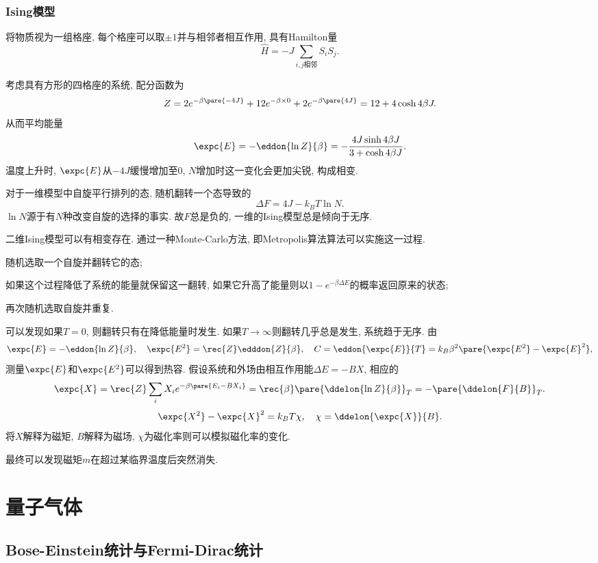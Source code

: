 \documentclass[../Thermal.tex]{subfiles}
\begin{document}
\subsubsection{Ising模型}
将物质视为一组格座, 每个格座可以取$\pm 1$并与相邻者相互作用, 具有Hamilton量
\[ \hat{H} = -J\sum_{i,j{\textit{相邻}}} S_i S_j. \]
\begin{ex}
考虑具有方形的四格座的系统, 配分函数为
\[ Z = 2e^{-\beta\pare{-4J}} + 12e^{-\beta\times 0} + 2e^{-\beta\pare{4J}} = 12+4\cosh 4\beta J. \]
从而平均能量
\[ \expc{E} = -\eddon{\ln Z}{\beta} = -\frac{4J\sinh 4\beta J}{3+\cosh 4\beta J}. \]
温度上升时, $\expc{E}$从$-4J$缓慢增加至$0$, $N$增加时这一变化会更加尖锐, 构成相变.
\end{ex}
对于一维模型中自旋平行排列的态, 随机翻转一个态导致的
\[ \Delta F = 4J - k_B T\ln N. \]
$\ln N$源于有$N$种改变自旋的选择的事实. 故$F$总是负的, 一维的Ising模型总是倾向于无序.
\par
二维Ising模型可以有相变存在. 通过一种Monte-Carlo方法, 即Metropolis算法算法可以实施这一过程.
\begin{cenum}
\item 随机选取一个自旋并翻转它的态;
\item 如果这个过程降低了系统的能量就保留这一翻转, 如果它升高了能量则以$1-e^{-\beta\Delta E}$的概率返回原来的状态;
\item 再次随机选取自旋并重复.
\end{cenum}
可以发现如果$T=0$, 则翻转只有在降低能量时发生. 如果$T\rightarrow \infty$则翻转几乎总是发生, 系统趋于无序. 由
\[ \expc{E} = -\eddon{\ln Z}{\beta},\quad \expc{E^2} = \rec{Z}\edddon{Z}{\beta},\quad C = \eddon{\expc{E}}{T} = k_B\beta^2\pare{\expc{E^2} - \expc{E}^2}, \]
测量$\expc{E}$和$\expc{E^2}$可以得到热容. 假设系统和外场由相互作用能$\Delta E = -BX$, 相应的
\[ \expc{X}  = \rec{Z} \sum_i X_i e^{-\beta\pare{E_i-BX_i}} = \rec{\beta}\pare{\ddelon{\ln Z}{\beta}}_T = -\pare{\ddelon{F}{B}}_T. \]
\[ \expc{X^2} - \expc{X}^2 = k_B T\chi,\quad \chi = \ddelon{\expc{X}}{B}. \]
将$X$解释为磁矩, $B$解释为磁场, $\chi$为磁化率则可以模拟磁化率的变化.
\begin{remark}
最终可以发现磁矩$m$在超过某临界温度后突然消失.
\end{remark}
\section{量子气体}
\subsection{Bose-Einstein统计与Fermi-Dirac统计}
\end{document}
